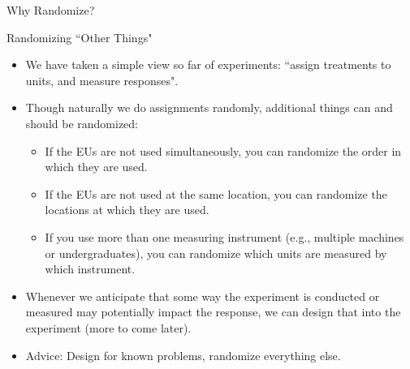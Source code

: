 \begin{frame}[allowframebreaks]{Why Randomize?}
\begin{itemize}
    
  \end{itemize}
  
\end{frame}

\begin{frame}[allowframebreaks]{Randomizing ``Other Things"}
  \begin{itemize}
    \item We have taken a simple view so far of experiments: ``assign treatments to units, and measure responses". 
    \item Though naturally we do assignments randomly, additional things can and should be randomized: 
    \begin{itemize}
      \item If the EUs are not used simultaneously, you can randomize the order in which they are used.
      \item If the EUs are not used at the same location, you can randomize the locations at which they are used.
      \item If you use more than one measuring instrument (e.g., multiple machines or undergraduates), you can randomize which units are measured by which instrument.
    \end{itemize}
    \item Whenever we anticipate that some way the experiment is conducted or measured may potentially impact the response, we can \alert{design} that into the experiment (more to come later).
    \item \alert{Advice:} Design for known problems, randomize everything else.
  \end{itemize}
\end{frame}

